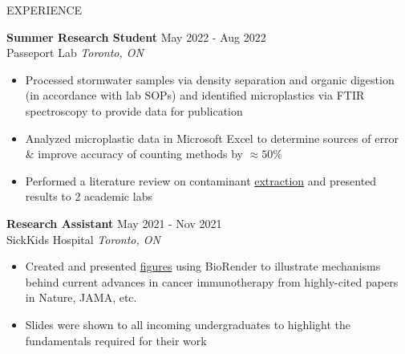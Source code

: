 \documentclass{resume}
\begin{document}
\begin{rSection}{EXPERIENCE}

\textbf{Summer Research Student} \hfill May 2022 - Aug 2022\\
Passeport Lab \hfill \textit{Toronto, ON}
\vspace{-0.2cm}
 \begin{itemize}
    \itemsep -8pt {} 
    \item Processed stormwater samples via density separation and organic digestion (in accordance with lab SOPs) and identified microplastics via FTIR spectroscopy to provide data for publication 
    \item Analyzed microplastic data in Microsoft Excel to determine sources of error \& improve accuracy of counting methods by $\approx50\%$
    \item Performed a literature review on contaminant \href{https://drive.google.com/file/d/1tVPh5Zt4zLT8spiLfzJ4vu0XZSuMfOfu/view}{extraction} and presented results to 2 academic labs

 \end{itemize}
 
\textbf{Research Assistant} \hfill May 2021 - Nov 2021\\
SickKids Hospital \hfill \textit{Toronto, ON}
\vspace{-0.2cm}
 \begin{itemize}
    \itemsep -8pt {} 
     \item Created and presented \href{https://drive.google.com/file/d/1459llsxjfB4-UA4sHfnBQ7wem0znVUL5/view?usp=sharing}{figures} using BioRender to illustrate mechanisms behind current advances in cancer immunotherapy from highly-cited papers in Nature, JAMA, etc.
     \item Slides were shown to all incoming undergraduates to highlight the fundamentals required for their work
 \end{itemize}


\end{rSection}
\end{document}
